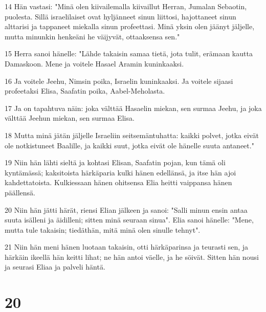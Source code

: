\par 14 Hän vastasi: "Minä olen kiivailemalla kiivaillut Herran, Jumalan Sebaotin, puolesta. Sillä israelilaiset ovat hyljänneet sinun liittosi, hajottaneet sinun alttarisi ja tappaneet miekalla sinun profeettasi. Minä yksin olen jäänyt jäljelle, mutta minunkin henkeäni he väijyvät, ottaaksensa sen."
\par 15 Herra sanoi hänelle: "Lähde takaisin samaa tietä, jota tulit, erämaan kautta Damaskoon. Mene ja voitele Hasael Aramin kuninkaaksi.
\par 16 Ja voitele Jeehu, Nimsin poika, Israelin kuninkaaksi. Ja voitele sijaasi profeetaksi Elisa, Saafatin poika, Aabel-Meholasta.
\par 17 Ja on tapahtuva näin: joka välttää Hasaelin miekan, sen surmaa Jeehu, ja joka välttää Jeehun miekan, sen surmaa Elisa.
\par 18 Mutta minä jätän jäljelle Israeliin seitsemäntuhatta: kaikki polvet, jotka eivät ole notkistuneet Baalille, ja kaikki suut, jotka eivät ole hänelle suuta antaneet."
\par 19 Niin hän lähti sieltä ja kohtasi Elisan, Saafatin pojan, kun tämä oli kyntämässä; kaksitoista härkäparia kulki hänen edellänsä, ja itse hän ajoi kahdettatoista. Kulkiessaan hänen ohitsensa Elia heitti vaippansa hänen päällensä.
\par 20 Niin hän jätti härät, riensi Elian jälkeen ja sanoi: "Salli minun ensin antaa suuta isälleni ja äidilleni; sitten minä seuraan sinua". Elia sanoi hänelle: "Mene, mutta tule takaisin; tiedäthän, mitä minä olen sinulle tehnyt".
\par 21 Niin hän meni hänen luotaan takaisin, otti härkäparinsa ja teurasti sen, ja härkäin ikeellä hän keitti lihat; ne hän antoi väelle, ja he söivät. Sitten hän nousi ja seurasi Eliaa ja palveli häntä.

\chapter{20}

